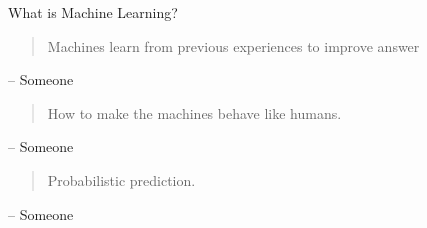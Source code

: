 What is Machine Learning?

\begin{quotation}
    Machines learn from previous experiences to improve answer
\end{quotation}
\begin{flushright}
    \--- Someone
\end{flushright}

\begin{quotation}
    How to make the machines behave like humans.
\end{quotation}
\begin{flushright}
    \--- Someone
\end{flushright}

\begin{quotation}
    Probabilistic prediction.
\end{quotation}
\begin{flushright}
    \--- Someone
\end{flushright}